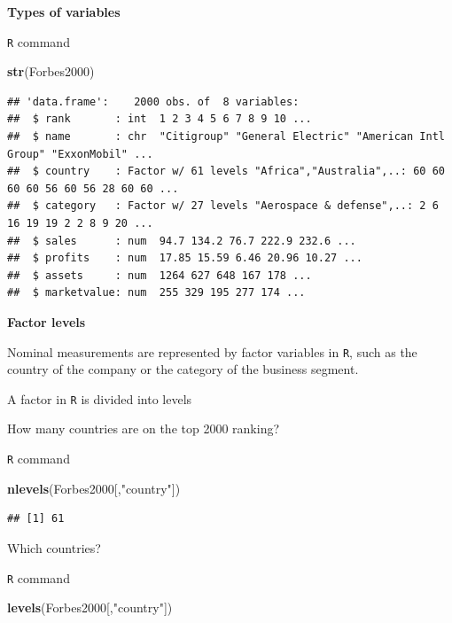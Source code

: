\documentclass[]{article}
\newenvironment{Shaded}{\begin{snugshade}}{\end{snugshade}}
\newcommand{\KeywordTok}[1]{\textcolor[rgb]{0.13,0.29,0.53}{\textbf{{#1}}}}
\newcommand{\StringTok}[1]{\textcolor[rgb]{0.31,0.60,0.02}{{#1}}}
\newcommand{\NormalTok}[1]{{#1}}
\numberwithin{equation}{section}
\begin{document}
\textbf{Types of variables}

\texttt{R} command

\begin{Shaded}
\begin{Highlighting}[]
\KeywordTok{str}\NormalTok{(Forbes2000)}
\end{Highlighting}
\end{Shaded}

\begin{verbatim}
## 'data.frame':    2000 obs. of  8 variables:
##  $ rank       : int  1 2 3 4 5 6 7 8 9 10 ...
##  $ name       : chr  "Citigroup" "General Electric" "American Intl Group" "ExxonMobil" ...
##  $ country    : Factor w/ 61 levels "Africa","Australia",..: 60 60 60 60 56 60 56 28 60 60 ...
##  $ category   : Factor w/ 27 levels "Aerospace & defense",..: 2 6 16 19 19 2 2 8 9 20 ...
##  $ sales      : num  94.7 134.2 76.7 222.9 232.6 ...
##  $ profits    : num  17.85 15.59 6.46 20.96 10.27 ...
##  $ assets     : num  1264 627 648 167 178 ...
##  $ marketvalue: num  255 329 195 277 174 ...
\end{verbatim}

\textbf{Factor levels}

Nominal measurements are represented by factor variables in \texttt{R},
such as the country of the company or the category of the business
segment.

A factor in \texttt{R} is divided into levels

How many countries are on the top 2000 ranking?

\texttt{R} command

\begin{Shaded}
\begin{Highlighting}[]
\KeywordTok{nlevels}\NormalTok{(Forbes2000[,}\StringTok{"country"}\NormalTok{])}
\end{Highlighting}
\end{Shaded}

\begin{verbatim}
## [1] 61
\end{verbatim}

Which countries?

\texttt{R} command

\begin{Shaded}
\begin{Highlighting}[]
\KeywordTok{levels}\NormalTok{(Forbes2000[,}\StringTok{"country"}\NormalTok{])}
\end{Highlighting}
\end{Shaded}
\end{document}

